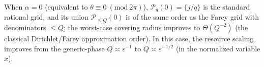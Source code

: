 \begin{remark}[Aligned case \texorpdfstring{$\alpha=0$}{alpha=0} and the \texorpdfstring{$Q^{-2}$}{Q^-2} improvement]\label{rem:zeta-cyclic-lift-aligned-farey-q2}
When \(\alpha=0\) (equivalent to \(\theta\equiv 0\ (\mathrm{mod}\ 2\pi)\)), \(\mathcal P_q(0)=\{j/q\}\) is the standard rational grid, and its union \(\mathcal P_{\le Q}(0)\) is of the same order as the Farey grid with denominators \(\le Q\); the worst-case covering radius improves to \(\Theta(Q^{-2})\) (the classical Dirichlet/Farey approximation order).
In this case, the resource scaling improves from the generic-phase \(Q\asymp \varepsilon^{-1}\) to \(Q\asymp \varepsilon^{-1/2}\) (in the normalized variable \(x\)).
\end{remark}

